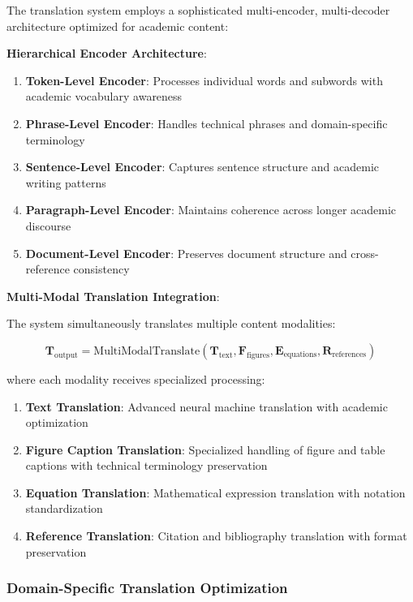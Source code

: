 \documentclass[10pt,twocolumn]{article}
\begin{document}
The translation system employs a sophisticated multi-encoder, multi-decoder architecture optimized for academic content:

\textbf{Hierarchical Encoder Architecture}:

\begin{enumerate}
    \item \textbf{Token-Level Encoder}: Processes individual words and subwords with academic vocabulary awareness
    \item \textbf{Phrase-Level Encoder}: Handles technical phrases and domain-specific terminology
    \item \textbf{Sentence-Level Encoder}: Captures sentence structure and academic writing patterns
    \item \textbf{Paragraph-Level Encoder}: Maintains coherence across longer academic discourse
    \item \textbf{Document-Level Encoder}: Preserves document structure and cross-reference consistency
\end{enumerate}

\textbf{Multi-Modal Translation Integration}:

The system simultaneously translates multiple content modalities:

\begin{equation}
\mathbf{T}_{\text{output}} = \text{MultiModalTranslate}(\mathbf{T}_{\text{text}}, \mathbf{F}_{\text{figures}}, \mathbf{E}_{\text{equations}}, \mathbf{R}_{\text{references}})
\end{equation}

where each modality receives specialized processing:

\begin{enumerate}
    \item \textbf{Text Translation}: Advanced neural machine translation with academic optimization
    \item \textbf{Figure Caption Translation}: Specialized handling of figure and table captions with technical terminology preservation
    \item \textbf{Equation Translation}: Mathematical expression translation with notation standardization
    \item \textbf{Reference Translation}: Citation and bibliography translation with format preservation
\end{enumerate}

\subsubsection{Domain-Specific Translation Optimization}
\end{document}
